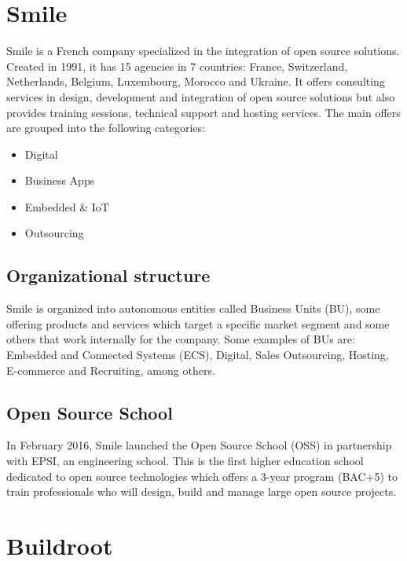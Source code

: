 \documentclass[12pt,a4paper,oneside]{article}
\begin{document}
\newpage
\section{Smile}
Smile is a French company specialized in the integration of open source
solutions. Created in 1991, it has 15 agencies in 7 countries: France,
Switzerland, Netherlands, Belgium, Luxembourg, Morocco and Ukraine. It offers
consulting services in design, development and integration of open source
solutions but also provides training sessions, technical support and hosting
services. The main offers are grouped into the following categories:
\begin{itemize}
  \item Digital
  \item Business Apps
  \item Embedded \& IoT
  \item Outsourcing
\end{itemize}

\subsection{Organizational structure}
Smile is organized into autonomous entities called Business Units (BU), some
offering products and services which target a specific market segment and
some others that work internally for the company. Some examples of BUs are:
Embedded and Connected Systems (ECS), Digital, Sales Outsourcing, Hosting,
E-commerce and Recruiting, among others.

\subsection{Open Source School}
In February 2016, Smile launched the Open Source School (OSS) in partnership
with EPSI, an engineering school. This is the first higher education school
dedicated to open source technologies which offers a 3-year program (BAC+5)
to train professionals who will design, build and manage large open source
projects.

\newpage
\section{Buildroot}
\end{document}
